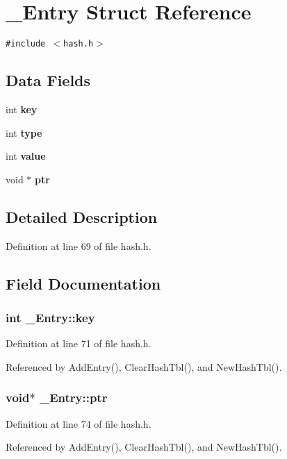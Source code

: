 \section{\_\-Entry Struct Reference}
\label{struct__Entry}
{\tt \#include $<$hash.h$>$}

\subsection*{Data Fields}
\begin{CompactItemize}
\item 
int \bf{key}
\item 
int \bf{type}
\item 
int \bf{value}
\item 
void $\ast$ \bf{ptr}
\end{CompactItemize}


\subsection{Detailed Description}




Definition at line 69 of file hash.h.

\subsection{Field Documentation}
\subsubsection{\setlength{\rightskip}{0pt plus 5cm}int \bf{\_\-Entry::key}}\label{struct__Entry_f5d4639486abe4e0f44ccfa22d9694cb}




Definition at line 71 of file hash.h.

Referenced by Add\-Entry(), Clear\-Hash\-Tbl(), and New\-Hash\-Tbl().
\subsubsection{\setlength{\rightskip}{0pt plus 5cm}void$\ast$ \bf{\_\-Entry::ptr}}\label{struct__Entry_dd57e5f3e46c37c5d956d49fce88a7e9}




Definition at line 74 of file hash.h.

Referenced by Add\-Entry(), Clear\-Hash\-Tbl(), and New\-Hash\-Tbl().
